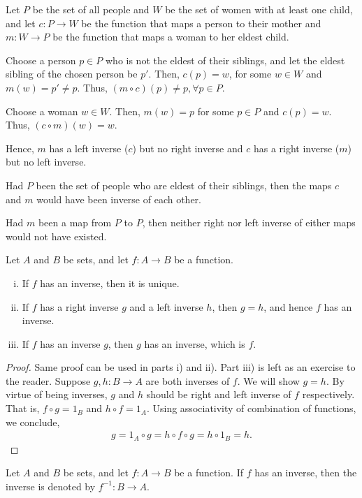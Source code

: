 \documentclass[a4paper,english,12pt]{article}
\begin{document}
\begin{exmp}
Let $P$ be the set of all people and $W$ be the set of women with at least one child, and let $c:P \to W$ be the function that maps a person to their mother and $m:W \to P$ be the function that maps a woman to her eldest child. 

Choose a person $p\in P$ who is not the eldest of their siblings, and let the eldest sibling of the chosen person be $p'$. Then, $c(p)=w$, for some $w\in W$ and $m(w)=p'\neq p$. Thus, $(m\circ c)(p)\neq p, \forall p\in P$.

Choose a woman $w\in W$. Then, $m(w)=p$ for some $p\in P$ and $c(p)=w$. Thus, $(c\circ m)(w)=w$.

Hence, $m$ has a left inverse ($c$) but no right inverse and $c$ has a right inverse ($m$) but no left inverse.

Had $P$ been the set of people who are eldest of their siblings, then the maps $c$ and $m$ would have been inverse of each other.

Had $m$ been a map from $P$ to $P$, then neither right nor left inverse of either maps would not have existed.
\end{exmp}

\begin{lem}[Uniqueness]
Let $A$ and $B$ be sets, and let $f:A \to B$ be a function.
\begin{enumerate}[i)]
\item If $f$ has an inverse, then it is unique.
\item If $f$ has a right inverse $g$ and a left inverse $h$, then $g=h$, and hence $f$ has an inverse.
\item If $f$ has an inverse $g$, then $g$ has an inverse, which is $f$.
\end{enumerate}
\end{lem}
\begin{proof} Same proof can be used in parts i) and ii). Part iii) is left as an exercise to the reader.
Suppose $g,h : B \to A$ are both inverses of $f$. We will show $g=h$. By virtue of being inverses, $g$ and $h$ should be right and left inverse of $f$ respectively. That is, $f \circ g = 1_B$ and $h \circ f = 1_A$. Using associativity of combination of functions, we conclude, 
\begin{align*}
g = 1_A \circ g = h \circ f \circ g = h \circ 1_B = h.
\end{align*}
\end{proof}
\begin{defn}
Let $A$ and $B$ be sets, and let $f:A \to B$ be a function. If $f$ has an inverse, then the inverse is denoted by $f^{-1}: B \to A$.
\end{defn}
\end{document}
